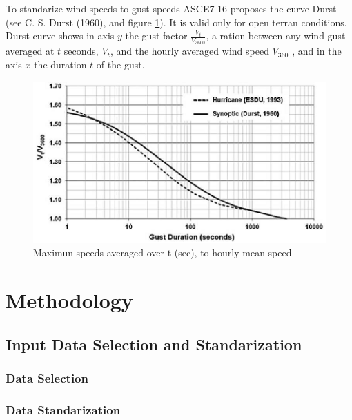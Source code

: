 \documentclass[12pt,twoside]{reedthesis}
\begin{document}
To standarize wind speeds to gust speeds ASCE7-16 proposes the curve Durst (see C. S. Durst (1960), and figure \ref{fig:durstcurve}). It is valid only for open terran conditions. Durst curve shows in axis \(y\) the gust factor \(\frac{V_t}{V_{3600}}\), a ration between any wind gust averaged at \(t\) seconds, \(V_t\), and the hourly averaged wind speed \(V_{3600}\), and in the axis \(x\) the duration \(t\) of the gust.

\footnotesize
\begin{figure}
\includegraphics[width=6.14in]{figure/durst} \caption{Maximun speeds averaged over t (sec), to hourly mean speed}\label{fig:durstcurve}
\end{figure}
\normalsize

\hypertarget{rmd-method}{%
\chapter{Methodology}\label{rmd-method}}

\hypertarget{input-data-selection-and-standarization}{%
\section{Input Data Selection and Standarization}\label{input-data-selection-and-standarization}}

\clearpage

\hypertarget{data-selection}{%
\subsection{Data Selection}\label{data-selection}}

\hypertarget{data-standarization}{%
\subsection{Data Standarization}\label{data-standarization}}
\end{document}
